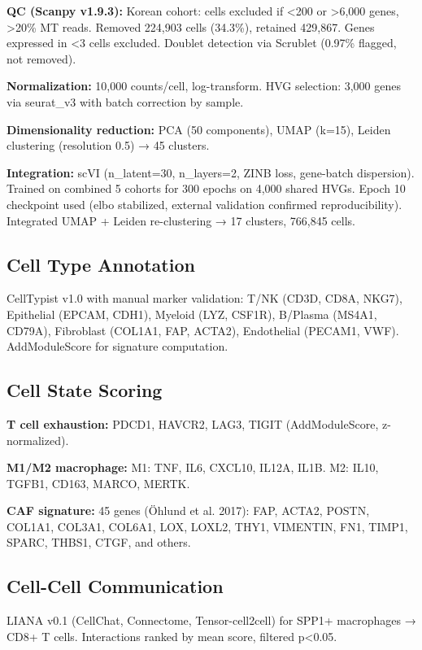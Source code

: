 \documentclass[12pt,twoside]{article}
\begin{document}
\textbf{QC (Scanpy v1.9.3):} Korean cohort: cells excluded if <200 or >6,000 genes, >20\% MT reads. Removed 224,903 cells (34.3\%), retained 429,867. Genes expressed in <3 cells excluded. Doublet detection via Scrublet (0.97\% flagged, not removed).

\textbf{Normalization:} 10,000 counts/cell, log-transform. HVG selection: 3,000 genes via seurat\_v3 with batch correction by sample.

\textbf{Dimensionality reduction:} PCA (50 components), UMAP (k=15), Leiden clustering (resolution 0.5) → 45 clusters.

\textbf{Integration:} scVI (n\_latent=30, n\_layers=2, ZINB loss, gene-batch dispersion). Trained on combined 5 cohorts for 300 epochs on 4,000 shared HVGs. Epoch 10 checkpoint used (elbo stabilized, external validation confirmed reproducibility). Integrated UMAP + Leiden re-clustering → 17 clusters, 766,845 cells.

\subsection{Cell Type Annotation}

CellTypist v1.0 with manual marker validation: T/NK (CD3D, CD8A, NKG7), Epithelial (EPCAM, CDH1), Myeloid (LYZ, CSF1R), B/Plasma (MS4A1, CD79A), Fibroblast (COL1A1, FAP, ACTA2), Endothelial (PECAM1, VWF). AddModuleScore for signature computation.

\subsection{Cell State Scoring}

\textbf{T cell exhaustion:} PDCD1, HAVCR2, LAG3, TIGIT (AddModuleScore, z-normalized).

\textbf{M1/M2 macrophage:} M1: TNF, IL6, CXCL10, IL12A, IL1B. M2: IL10, TGFB1, CD163, MARCO, MERTK.

\textbf{CAF signature:} 45 genes (Öhlund et al. 2017): FAP, ACTA2, POSTN, COL1A1, COL3A1, COL6A1, LOX, LOXL2, THY1, VIMENTIN, FN1, TIMP1, SPARC, THBS1, CTGF, and others.

\subsection{Cell-Cell Communication}

LIANA v0.1 (CellChat, Connectome, Tensor-cell2cell) for SPP1+ macrophages → CD8+ T cells. Interactions ranked by mean score, filtered p<0.05.
\end{document}
